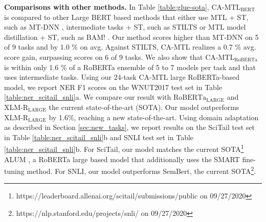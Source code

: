 \documentclass{article} \usepackage{iclr2021_conference,times}
\begin{document}
\textbf{Comparisons with other methods.} In Table \ref{table:glue-sota}, $\text{CA-MTL}_{\text{BERT}}$ is compared to other Large BERT based methods that either use MTL + ST, such as MT-DNN \citep{mtl_bert_liu2019}, intermediate tasks + ST, such as STILTS \citep{DBLP:journals/corr/abs-1811-01088} or MTL model distillation + ST, such as BAM! \citep{mtl_bert_clark2019}. Our method scores higher than MT-DNN on 5 of 9 tasks and by 1.0 \% on avg. Against STILTS, CA-MTL realizes a 0.7 \% avg. score gain, surpassing scores on 6 of 9 tasks. We also show that $\text{CA-MTL}_{\text{RoBERTa}}$ is within only 1.6 \% of a RoBERTa ensemble of 5 to 7 models per task and that uses intermediate tasks. Using our 24-task CA-MTL large RoBERTa-based model, we report NER F1 scores on the WNUT2017 test set in Table \ref{table:ner_scitail_snli}a. 
We compare our result with $\text{RoBERTa}_{\text{LARGE}}$ and  $\text{XLM-R}_{\text{LARGE}}$ \citep{nguyen2020bertweet} the current state-of-the-art (SOTA). Our model outperforms $\text{XLM-R}_{\text{LARGE}}$ by 1.6\%, reaching a new state-of-the-art. Using domain adaptation as described in Section \ref{sec:new_tasks}, we report results on the SciTail test set in Table \ref{table:ner_scitail_snli}b and SNLI test set in Table \ref{table:ner_scitail_snli}b. For SciTail, our model matches the current SOTA\footnote{https://leaderboard.allenai.org/scitail/submissions/public on 09/27/2020} ALUM \citep{liu2020adversarial}, a RoBERTa large based model that additionally uses the SMART \citep{jiang-etal-2020-smart} fine-tuning method. For SNLI, our model outperforms SemBert, the current SOTA\footnote{https://nlp.stanford.edu/projects/snli/ on 09/27/2020}. 
\end{document}
